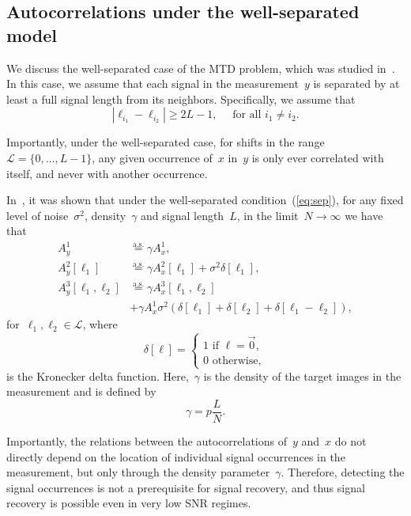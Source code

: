 \documentclass{article}
\begin{document}
\subsection{Autocorrelations under the well-separated model}
\label{subsec:relations}
We discuss the \mbox{well-separated} case of the MTD problem, which was studied in~\cite{bendory2019multi}. In this case, we assume that each signal in the measurement~$y$ is separated by at least a full signal length from its neighbors. Specifically, we assume that
\begin{equation}
\label{eq:sep}
|\ell_{i_1} - \ell_{i_2}| \ge 2L - 1, \quad \text{ for all } i_1 \ne i_2.
\end{equation}

Importantly, under the well-separated case, for shifts in the range~$\mathcal{L} = \{0, \ldots, {L - 1}\}$, any given occurrence of~$x$ in~$y$ is only ever correlated with itself, and never with another occurrence.

In~\cite{bendory2019multi}, it was shown that under the well-separated condition~(\ref{eq:sep}), for any fixed level of noise~$\sigma^2$, density~$\gamma$ and signal length~$L$, in the limit~\mbox{$N \rightarrow \infty$} we have that
\begin{align}
A_{y}^1 &\stackrel{\text{a.s.}}{=} \gamma A_{x}^1, \\
A_{y}^2 [\ell_1] &\stackrel{\text{a.s.}}{=} \gamma A_{x}^2 [\ell_1] + \sigma^2\delta[\ell_1], \\
A_{y}^3 [\ell_1, \ell_2] &\stackrel{\text{a.s.}}{=} \gamma A_{x}^3 [\ell_1, \ell_2] \nonumber \\&+ \gamma A_{x}^1 \sigma^2 (\delta[\ell_1] + \delta[\ell_2] + \delta[\ell_1 - \ell_2]),
\end{align}
for~$\ell_1, \ell_2 \in \mathcal{L}$, where
\begin{equation*}
\delta[\ell] = \begin{cases} 1 \text{ if } \ell = \vec{0}, \\ 0 \text{ otherwise}, \end{cases}
\end{equation*}
is the Kronecker delta function. Here,~$\gamma$ is the density of the target images in the measurement and is defined by
\begin{equation}
\gamma = p \frac{L}{N}.
\end{equation}

Importantly, the relations between the autocorrelations of~$y$ and~$x$ do not directly depend on the location of individual signal occurrences in the measurement, but only through the density parameter~$\gamma$. Therefore, detecting the signal occurrences is not a prerequisite for signal recovery, and thus signal recovery is possible even in very low SNR regimes.
\end{document}
